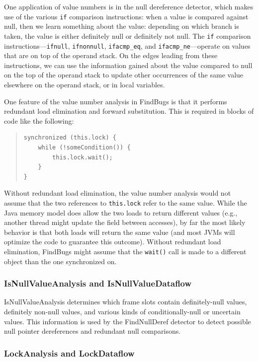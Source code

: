 \documentclass[11pt]{article}
\begin{document}
One application of value numbers is in the null dereference detector,
which makes use of the various {\tt if} comparison instructions:
when a value is compared against null, then we learn something about
the value: depending on which branch is taken, the value is either definitely
null or definitely not null.  The {\tt if} comparison instructions---{\tt ifnull},
{\tt ifnonnull}, {\tt ifacmp\_eq}, and {\tt ifacmp\_ne}---operate on
values that are on top of the operand stack.  On the edges leading from
these instructions, we can use the information gained about the value
compared to null on the top of the operand stack to update other occurrences of
the same value elsewhere on the operand stack, or in local variables.

One feature of the value number analysis in FindBugs is that it
performs redundant load elimination and forward substitution.
This is required in blocks of code like the following:
\begin{quote}
\begin{verbatim}
synchronized (this.lock) {
    while (!someCondition()) {
        this.lock.wait();
    }
}
\end{verbatim}
\end{quote}
%
Without redundant load elimination, the value number analysis would not
assume that the two references to {\tt this.lock} refer to the same value.
While the Java memory model does allow the two loads to return
different values (e.g., another thread might update the field between
accesses), by far the most likely behavior is that both loads will
return the same value (and most JVMs will optimize the code to
guarantee this outcome).  Without redundant load elimination, FindBugs
might assume that the {\tt wait()} call is made to a different object
than the one synchronized on.

\subsubsection{IsNullValueAnalysis and IsNullValueDataflow}

IsNullValueAnalysis determines which frame slots contain definitely-null
values, definitely non-null values, and various kinds of conditionally-null
or uncertain values.  This information is used by the FindNullDeref
detector to detect possible null pointer dereferences and redundant null
comparisons.

\subsubsection{LockAnalysis and LockDataflow}
\end{document}
